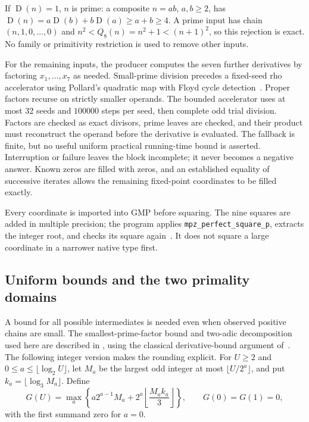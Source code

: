 \documentclass[11pt]{article}
\newcommand{\D}{\operatorname{D}}
\theoremstyle{definition}
\theoremstyle{remark}
\begin{document}
If $\D(n)=1$, $n$ is prime: a composite $n=ab$, $a,b\ge2$, has
$\D(n)=a\D(b)+b\D(a)\ge a+b\ge4$.
A prime input has chain $(n,1,0,\ldots,0)$ and
$n^2<Q_8(n)=n^2+1<(n+1)^2$, so this rejection is exact.
No family or primitivity restriction is used to remove other inputs.

For the remaining inputs, the producer computes the seven further
derivatives by factoring $x_1,\ldots,x_7$ as needed. Small-prime
division precedes a fixed-seed rho accelerator using Pollard's
quadratic map with Floyd cycle detection~\cite{pollard}. Proper factors recurse on strictly smaller
operands. The bounded accelerator uses at most 32 seeds and
$100000$ steps per seed, then complete odd trial division.
Factors are checked as exact divisors, prime leaves are checked,
and their product must reconstruct the operand before the derivative
is evaluated. The fallback is finite, but no useful uniform
practical running-time bound is asserted. Interruption or failure
leaves the block incomplete; it never becomes a negative answer.
Known zeros are filled with zeros, and an established equality of
successive iterates allows the remaining fixed-point coordinates to
be filled exactly.

Every coordinate is imported into GMP before squaring. The nine
squares are added in multiple precision; the program applies
\texttt{mpz\_perfect\_square\_p}, extracts the integer root, and
checks its square again~\cite{gmp}. It does not square a large
coordinate in a narrower native type first.

\subsection{Uniform bounds and the two primality domains}

A bound for all possible intermediates is needed even when observed
positive chains are small. The smallest-prime-factor bound and
two-adic decomposition used here are described in
\cite[Theorems 2.1.1 and 3.2.2]{dahl}, using the classical
derivative-bound argument of~\cite[Theorem 9]{ufnarovski}.
The following integer version
makes the rounding explicit. For $U\ge2$ and
$0\le a\le\lfloor\log_2 U\rfloor$, let $M_a$ be the largest odd
integer at most $\lfloor U/2^a\rfloor$, and put
$k_a=\lfloor\log_3M_a\rfloor$. Define
\begin{equation}\label{eq:majorant}
 G(U)=\max_a\left\{
 a2^{a-1}M_a+2^a\left\lfloor\frac{M_a k_a}{3}\right\rfloor
 \right\},\qquad G(0)=G(1)=0,
\end{equation}
with the first summand zero for $a=0$.
\end{document}
